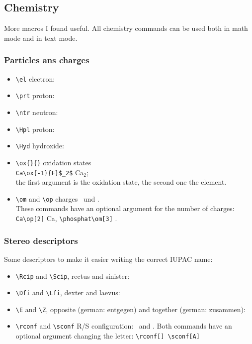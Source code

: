 \documentclass[DIV10]{scrartcl}
\begin{document}
\subsection{Chemistry}
More macros I found useful. All chemistry commands can be used both in math mode and in text mode.
\subsubsection{Particles ans charges}
\begin{itemize}
 \item \verb=\el= electron: \el
 \item \verb=\prt= proton: \prt
 \item \verb=\ntr= neutron: \ntr
 \item \verb=\Hpl= proton: \Hpl
 \item \verb=\Hyd= hydroxide: \Hyd
 \item \verb=\ox{}{}= oxidation states\\
       \verb=Ca\ox{-1}{F}$_2$=  Ca$_2$;\\
       the first argument is the oxidation state, the second one the element.
 \item \verb=\om= and \verb=\op= charges \om\ und \op.\\
       These commands have an optional argument for the number of charges:\\\verb=Ca\op[2]=  Ca\op[2], \verb=\phosphat\om[3]=  \phosphat\om[3].
\end{itemize}

\subsubsection{Stereo descriptors}\label{sssec:stereo}
Some descriptors to make it easier writing the correct IUPAC name:
\begin{itemize}
 \item \verb=\Rcip= and \verb=\Scip=, rectus and sinister: \Rcip\ \Scip
 \item \verb=\Dfi= and \verb=\Lfi=, dexter and laevus: \Dfi\ \Lfi
 \item \verb=\E= and \verb=\Z=, opposite (german: entgegen) and together (german: zusammen): \E\ \Z
 \item \verb=\rconf= and \verb=\sconf= R/S configuration: \rconf\ and \sconf. Both commands have an optional argument changing the letter: \verb=\rconf[] \sconf[A]= \rconf[] \sconf[A]
\end{itemize}
\end{document}
